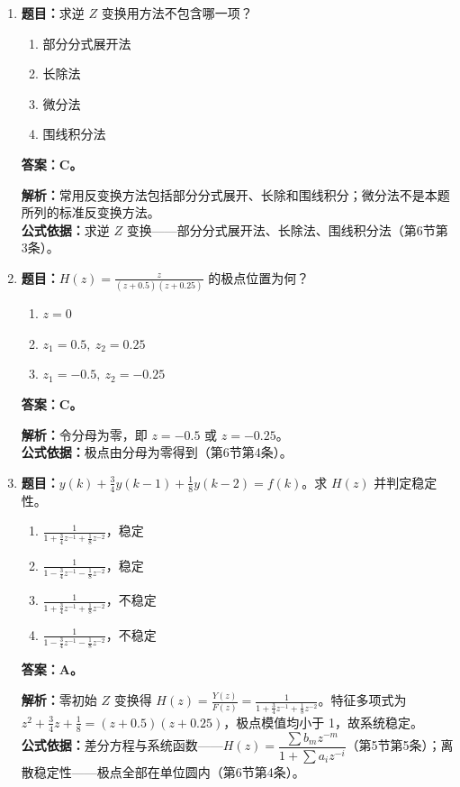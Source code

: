 \documentclass[12pt,a4paper]{ctexart}
\begin{document}
\begin{enumerate}[label=\arabic*.]
\item \textbf{题目：}求逆 $Z$ 变换用方法不包含哪一项？
\begin{enumerate}[label=\Alph*.]
\item 部分分式展开法
\item 长除法
\item 微分法
\item 围线积分法
\end{enumerate}
\textbf{答案：C。}\par
\textbf{解析：}常用反变换方法包括部分分式展开、长除和围线积分；微分法不是本题所列的标准反变换方法。\\
\textbf{公式依据：}求逆 $Z$ 变换——部分分式展开法、长除法、围线积分法（第6节第3条）。

\item \textbf{题目：}\(\displaystyle H(z)=\frac{z}{(z+0.5)(z+0.25)}\) 的极点位置为何？
\begin{enumerate}[label=\Alph*.]
\item $z=0$
\item $z_1=0.5,\ z_2=0.25$
\item $z_1=-0.5,\ z_2=-0.25$
\end{enumerate}
\textbf{答案：C。}\par
\textbf{解析：}令分母为零，即 $z=-0.5$ 或 $z=-0.25$。\\
\textbf{公式依据：}极点由分母为零得到（第6节第4条）。

\item \textbf{题目：}\(\displaystyle y(k)+\frac34y(k-1)+\frac18y(k-2)=f(k)\)。求 $H(z)$ 并判定稳定性。
\begin{enumerate}[label=\Alph*.]
\item $\displaystyle \frac1{1+\frac34z^{-1}+\frac18z^{-2}}$，稳定
\item $\displaystyle \frac1{1-\frac34z^{-1}-\frac18z^{-2}}$，稳定
\item $\displaystyle \frac1{1+\frac34z^{-1}+\frac18z^{-2}}$，不稳定
\item $\displaystyle \frac1{1-\frac34z^{-1}-\frac18z^{-2}}$，不稳定
\end{enumerate}
\textbf{答案：A。}\par
\textbf{解析：}零初始 $Z$ 变换得 \(\displaystyle H(z)=\frac{Y(z)}{F(z)}=\frac1{1+\frac34z^{-1}+\frac18z^{-2}}\)。特征多项式为 \(\displaystyle z^2+\frac34z+\frac18=(z+0.5)(z+0.25)\)，极点模值均小于 1，故系统稳定。\\
\textbf{公式依据：}差分方程与系统函数——$H(z)=\dfrac{\sum b_mz^{-m}}{1+\sum a_i z^{-i}}$（第5节第5条）；离散稳定性——极点全部在单位圆内（第6节第4条）。


\end{enumerate}
\end{document}
